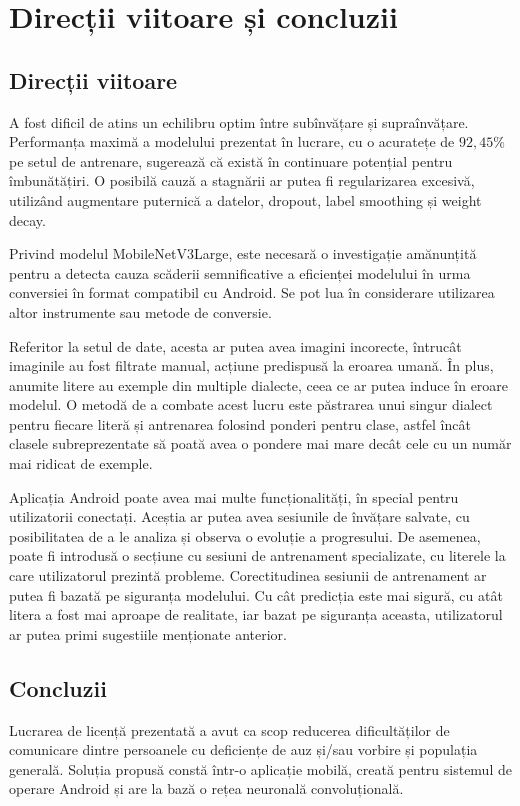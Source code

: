 \chapter{Direcții viitoare și concluzii}
\label{cap:cap4}

\section{Direcții viitoare}

A fost dificil de atins un echilibru optim între subînvățare și supraînvățare. Performanța maximă a modelului prezentat în lucrare, cu o acuratețe de $92,45\%$ pe setul de antrenare, sugerează că există în continuare potențial pentru îmbunătățiri. O posibilă cauză a stagnării ar putea fi regularizarea excesivă, utilizând augmentare puternică a datelor, dropout, label smoothing și weight decay. 

Privind modelul MobileNetV3Large, este necesară o investigație amănunțită pentru a detecta cauza scăderii semnificative a eficienței modelului în urma conversiei în format compatibil cu Android. Se pot lua în considerare utilizarea altor instrumente sau metode de conversie.

Referitor la setul de date, acesta ar putea avea imagini incorecte, întrucât imaginile au fost filtrate manual, acțiune predispusă la eroarea umană. În plus, anumite litere au exemple din multiple dialecte, ceea ce ar putea induce în eroare modelul. O metodă de a combate acest lucru este păstrarea unui singur dialect pentru fiecare literă și antrenarea folosind ponderi pentru clase, astfel încât clasele subreprezentate să poată avea o pondere mai mare decât cele cu un număr mai ridicat de exemple.

Aplicația Android poate avea mai multe funcționalități, în special pentru utilizatorii conectați. Aceștia ar putea avea sesiunile de învățare salvate, cu posibilitatea de a le analiza și observa o evoluție a progresului. De asemenea, poate fi introdusă o secțiune cu sesiuni de antrenament specializate, cu literele la care utilizatorul prezintă probleme. Corectitudinea sesiunii de antrenament ar putea fi bazată pe siguranța modelului. Cu cât predicția este mai sigură, cu atât litera a fost mai aproape de realitate, iar bazat pe siguranța aceasta, utilizatorul ar putea primi sugestiile menționate anterior.

\section{Concluzii}
Lucrarea de licență prezentată a avut ca scop reducerea dificultăților de comunicare dintre persoanele cu deficiențe de auz și/sau vorbire și populația generală. Soluția propusă constă într-o aplicație mobilă, creată pentru sistemul de operare Android și are la bază o rețea neuronală convoluțională. 

